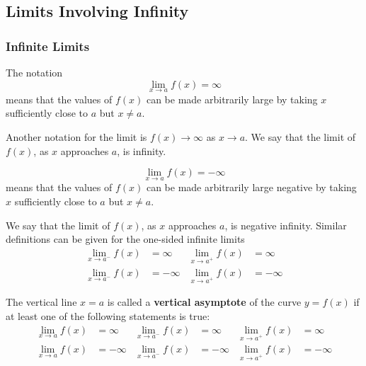 \subsection{Limits Involving Infinity}

\subsubsection*{Infinite Limits}
\begin{definition}
    The notation
    \[\lim_{x\to a}f(x)=\infty\]
    means that the values of \(f(x)\) can be made arbitrarily large by taking
    \(x\) sufficiently close to \(a\) but \(x\neq a\).
\end{definition}
Another notation for the limit is \(f(x)\to\infty\) as \(x\to a\).
We say that the limit of \(f(x)\),
as \(x\) approaches \(a\),
is infinity.
\begin{definition}
    \[\lim_{x\to a}f(x)=-\infty\]
    means that the values of \(f(x)\) can be made arbitrarily large negative
    by taking \(x\) sufficiently close to \(a\) but \(x\neq a\).
\end{definition}
We say that the limit of \(f(x)\),
as \(x\) approaches \(a\),
is negative infinity.
Similar definitions can be given for the one-sided infinite limits
\begin{align*}
    \lim_{x\to a^-}f(x) &= \infty & \lim_{x\to a^+}f(x) &= \infty \\
    \lim_{x\to a^-}f(x) &= -\infty & \lim_{x\to a^+}f(x) &= -\infty
\end{align*}
\begin{definition}
    The vertical line \(x=a\) is called a \textbf{vertical asymptote} of the
    curve \(y=f(x)\) if at least one of the following statements is true:
    \begin{align*}
        \lim_{x\to a}f(x) &= \infty & \lim_{x\to a^-}f(x) &= \infty
        & \lim_{x\to a^+}f(x) &= \infty \\
        \lim_{x\to a}f(x) &= -\infty & \lim_{x\to a^-}f(x) &= -\infty
        & \lim_{x\to a^+}f(x) &= -\infty
    \end{align*}
\end{definition}

